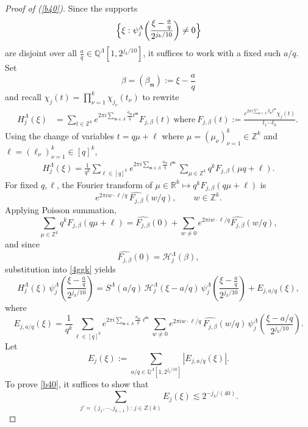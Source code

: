 \documentclass[10pt,a4paper]{amsart}
\numberwithin{equation}{section}
\begin{document}
 
\begin{proof}[Proof of  (\ref{b40})] 
Since the supports 
\[
\Bigl\{\xi:\psi_j^{\Lambda}\!\left(\frac{\xi-\frac{a}{q}}{2^{j_k/10}}\right)\neq 0\Bigr\}
\]
are disjoint over all $\frac{a}{q}\in\mathbb{Q}^{\Lambda}[1,2^{j_k/10}]$, it suffices to work with a fixed such $a/q$.  
Set
\[
\beta=(\beta_{\mathfrak m}) := \xi-\frac{a}{q}
\]
and recall  $\chi_j(t)=\prod_{\nu=1}^k \chi_{j_{\nu}}(t_\nu)$ to rewrite 
 \begin{align*}
  H^{\Lambda}_j(\xi) &= \sum_{t\in\mathbb{Z}^k} e^{2\pi i\sum_{\mathfrak{m}\in \Lambda}  
 \frac{a_{\mathfrak{m}}}{q} t^{\mathfrak{m}}}F_{j,\beta}(t) \ \text{where}\
 F_{j,\beta}(t):=\frac{e^{2\pi i \sum_{\mathfrak{m}\in \Lambda}  \beta_{\mathfrak{m}}t^{\mathfrak{m}} }\chi_j(t) }{t_1\cdots t_k}.\  
 \end{align*}
 Using the change of variables
  $t=q\mu+\ell$ where $\mu= (\mu_\nu)_{\nu=1}^k\in \mathbb{Z}^k$ and $\ell=(\ell_\nu)_{\nu=1}^k  \in [q]^k$,  
 \begin{align}\label{4ggk}
 H^{\Lambda}_j(\xi)  = \frac{1}{q^k} \sum_{\ell\in [q]^k} e^{2\pi  i\sum_{\mathfrak{m}\in \Lambda}  \frac{a_{\mathfrak{m}}}{q}\ell^{\mathfrak{m}}}\sum_{\mu\in\mathbb{Z}^k} q^k F_{j,\beta}(\mu q+\ell).
\end{align}
For fixed $q,\ell$, the Fourier transform of $\mu\in \mathbb{R}^k \mapsto q^k F_{j,\beta}(q\mu+\ell)$  is
\[
e^{2\pi i w\cdot \ell/q}\,\widehat{F_{j,\beta}}(w/q),\qquad w\in\mathbb{Z}^k.
\] 
Applying Poisson summation,
\[
\sum_{\mu\in\mathbb{Z}^k} q^kF_{j,\beta}(q\mu+\ell)
=
\widehat{F_{j,\beta}}(0)+
\sum_{w\neq 0}
e^{2\pi i w\cdot\ell/q}\widehat{F_{j,\beta}}(w/q),
\]
and since 
\[
\widehat{F_{j,\beta}}(0)=\mathcal{H}_j^{\Lambda}(\beta),
\]
substitution into \eqref{4ggk} yields
\[
H_j^\Lambda(\xi)\,
\psi_j^\Lambda\!\left(\frac{\xi-\frac{a}{q}}{2^{j_k/10}}\right)
=
S^\Lambda(a/q)\,
\mathcal{H}_j^\Lambda(\xi-a/q)\,
\psi_j^\Lambda\!\left(\frac{\xi-\frac{a}{q}}{2^{j_k/10}}\right)
+
E_{j,a/q}(\xi),
\]
where
\[
E_{j,a/q}(\xi)
=
\frac{1}{q^k}
\sum_{\ell\in[q]^k}
e^{2\pi i\sum_{\mathfrak m\in\Lambda}\frac{a_{\mathfrak m}}{q}\ell^{\mathfrak m}}
\sum_{w\neq 0}
e^{2\pi i w\cdot\ell/q}\,
\widehat{F_{j,\beta}}(w/q)\,
\psi_j^\Lambda\!\left(\frac{\xi-a/q}{2^{j_k/10}}\right).
\]
Let
\[
E_j(\xi):=\sum_{a/q\in\mathbb{Q}^{\Lambda}[1,2^{j_k/10}]} |E_{j,a/q}(\xi)|.
\]
To prove \eqref{b40}, it suffices to show that
\begin{equation*}
\sum_{j'=(j_1,\cdots,j_{k-1}):\, j\in Z(k)} E_j(\xi) \lesssim 2^{- j_k/(40)}.
\end{equation*}

\end{proof}
\end{document}

